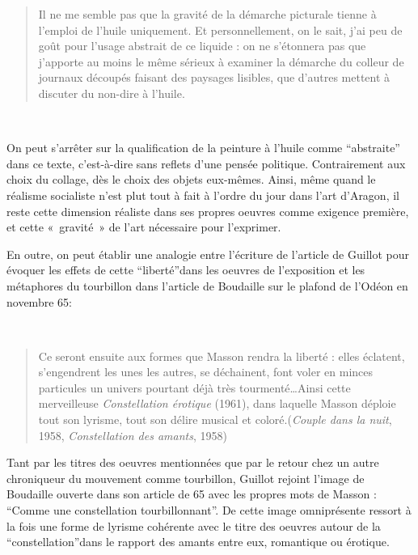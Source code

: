 \begin{quote}
Il ne me semble pas que la gravité de la démarche picturale tienne à l’emploi de l’huile uniquement. Et personnellement, on le sait, j’ai peu de goût pour l’usage abstrait de ce liquide : on ne s’étonnera pas que j’apporte au moins le même sérieux à examiner la démarche du colleur de journaux découpés faisant des paysages lisibles, que d’autres mettent à discuter du non-dire à l’huile.	
\end{quote}
 

	 On peut s’arrêter sur la qualification de la peinture à l’huile comme \enquote{abstraite} dans ce texte, c’est-à-dire sans reflets d’une pensée politique. Contrairement aux choix du collage, dès le choix des objets eux-mêmes. Ainsi, même quand le réalisme socialiste n’est plut tout à fait à l’ordre du jour dans l’art d’Aragon, il reste cette dimension réaliste dans ses propres oeuvres comme exigence première, et cette « gravité » de l’art nécessaire pour l’exprimer.

En outre, on peut établir une analogie entre l’écriture de l’article de Guillot pour évoquer les effets de cette \enquote{liberté}dans les oeuvres de l’exposition et les métaphores du tourbillon dans l’article de Boudaille sur le plafond de l’Odéon en novembre 65: 

 \begin{quote}
Ce seront ensuite aux formes que Masson rendra la liberté : elles éclatent, s’engendrent les unes les autres, se déchainent, font voler en minces particules un univers pourtant déjà très tourmenté…Ainsi cette merveilleuse \emph{Constellation érotique} (1961), dans laquelle Masson déploie tout son lyrisme, tout son délire musical et coloré.(\emph{Couple dans la nuit}, 1958, \emph{Constellation des amants}, 1958)	
\end{quote}

	Tant par les titres des oeuvres mentionnées que par le retour chez un autre chroniqueur du mouvement comme tourbillon, Guillot rejoint l’image de Boudaille ouverte dans son article de 65 avec les propres mots de Masson : \enquote{Comme une constellation tourbillonnant}. De cette image omniprésente ressort à la fois une forme de lyrisme cohérente avec le titre des oeuvres autour de la \enquote{constellation}dans le rapport des amants entre eux, romantique ou érotique. 

